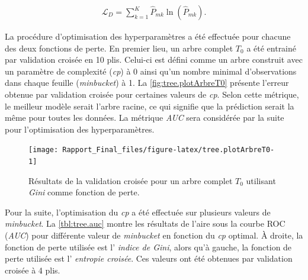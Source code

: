 \documentclass[]{article}
\begin{document}
\begin{align}
    \mathcal{L}_D = \sum_{k=1}^K \widehat{P}_{mk} \ln( \widehat{P}_{mk}).
\end{align}

La procédure d'optimisation des hyperparamètres a été effectuée pour
chacune des deux fonctions de perte. En premier lieu, un arbre complet
\(T_0\) a été entrainé par validation croisée en 10 plis. Celui-ci est
défini comme un arbre construit avec un paramètre de complexité
(\emph{cp}) à 0 ainsi qu'un nombre minimal d'observations dans chaque
feuille (\emph{minbucket}) à 1. La \autoref{fig:tree.plotArbreT0}
présente l'erreur obtenue par validation croisée pour certaines valeurs
de \emph{cp}. Selon cette métrique, le meilleur modèle serait l'arbre
racine, ce qui signifie que la prédiction serait la même pour toutes les
données. La métrique \emph{AUC} sera considérée par la suite pour
l'optimisation des hyperparamètres.

\begin{figure}

{\centering \texttt{[image: Rapport\_Final\_files/figure-latex/tree.plotArbreT0-1]} 

}

\caption{Résultats de la validation croisée pour un arbre complet $T_0$ utilisant \emph{Gini} comme fonction de perte.}\label{fig:tree.plotArbreT0}
\end{figure}

\newpage

Pour la suite, l'optimisation du \emph{cp} a été effectuée sur plusieurs
valeurs de \emph{minbucket}. La \autoref{tbl:tree.auc} montre les
résultats de l'aire sous la courbe ROC (\emph{AUC}) pour différente
valeur de \emph{minbucket} en fonction du \emph{cp} optimal. À droite,
la fonction de perte utilisée est l' \emph{indice de Gini}, alors qu'à
gauche, la fonction de perte utilisée est l' \emph{entropie croisée}.
Ces valeurs ont été obtenues par validation croisée à 4 plis.
\end{document}
